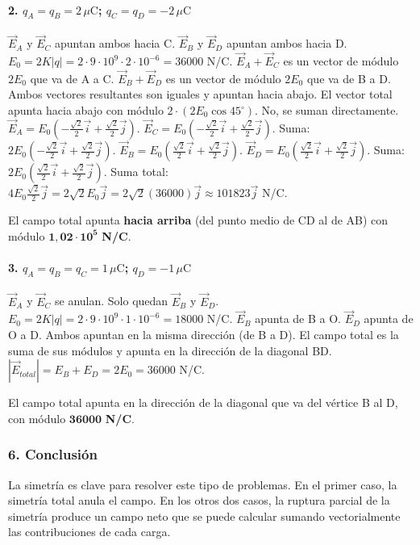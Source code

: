 \paragraph*{2. $q_A=q_B=2\,\mu\text{C}$; $q_C=q_D=-2\,\mu\text{C}$}
$\vec{E}_A$ y $\vec{E}_C$ apuntan ambos hacia C. $\vec{E}_B$ y $\vec{E}_D$ apuntan ambos hacia D.
$E_0 = 2K|q| = 2 \cdot 9\cdot10^9 \cdot 2\cdot10^{-6} = 36000$ N/C.
$\vec{E}_A+\vec{E}_C$ es un vector de módulo $2E_0$ que va de A a C.
$\vec{E}_B+\vec{E}_D$ es un vector de módulo $2E_0$ que va de B a D.
Ambos vectores resultantes son iguales y apuntan hacia abajo. El vector total apunta hacia abajo con módulo $2 \cdot (2E_0 \cos 45^\circ)$. No, se suman directamente.
$\vec{E}_A = E_0(-\frac{\sqrt{2}}{2}\vec{i} + \frac{\sqrt{2}}{2}\vec{j})$. $\vec{E}_C = E_0(-\frac{\sqrt{2}}{2}\vec{i} + \frac{\sqrt{2}}{2}\vec{j})$. Suma: $2E_0(-\frac{\sqrt{2}}{2}\vec{i} + \frac{\sqrt{2}}{2}\vec{j})$.
$\vec{E}_B = E_0(\frac{\sqrt{2}}{2}\vec{i} + \frac{\sqrt{2}}{2}\vec{j})$. $\vec{E}_D = E_0(\frac{\sqrt{2}}{2}\vec{i} + \frac{\sqrt{2}}{2}\vec{j})$. Suma: $2E_0(\frac{\sqrt{2}}{2}\vec{i} + \frac{\sqrt{2}}{2}\vec{j})$.
Suma total: $4E_0\frac{\sqrt{2}}{2}\vec{j} = 2\sqrt{2}E_0 \vec{j} = 2\sqrt{2}(36000)\vec{j} \approx 101823\vec{j}$ N/C.
\begin{cajaresultado}
    El campo total apunta \textbf{hacia arriba} (del punto medio de CD al de AB) con módulo $\boldsymbol{1,02 \cdot 10^5}$ \textbf{N/C}.
\end{cajaresultado}

\paragraph*{3. $q_A=q_B=q_C=1\,\mu\text{C}$; $q_D=-1\,\mu\text{C}$}
$\vec{E}_A$ y $\vec{E}_C$ se anulan. Solo quedan $\vec{E}_B$ y $\vec{E}_D$.
$E_0 = 2K|q| = 2 \cdot 9\cdot10^9 \cdot 1\cdot10^{-6} = 18000$ N/C.
$\vec{E}_B$ apunta de B a O. $\vec{E}_D$ apunta de O a D. Ambos apuntan en la misma dirección (de B a D).
El campo total es la suma de sus módulos y apunta en la dirección de la diagonal BD.
$|\vec{E}_{total}| = E_B + E_D = 2E_0 = 36000$ N/C.
\begin{cajaresultado}
    El campo total apunta en la dirección de la diagonal que va del vértice B al D, con módulo $\boldsymbol{36000}$ \textbf{N/C}.
\end{cajaresultado}

\subsubsection*{6. Conclusión}
\begin{cajaconclusion}
La simetría es clave para resolver este tipo de problemas. En el primer caso, la simetría total anula el campo. En los otros dos casos, la ruptura parcial de la simetría produce un campo neto que se puede calcular sumando vectorialmente las contribuciones de cada carga.
\end{cajaconclusion}

